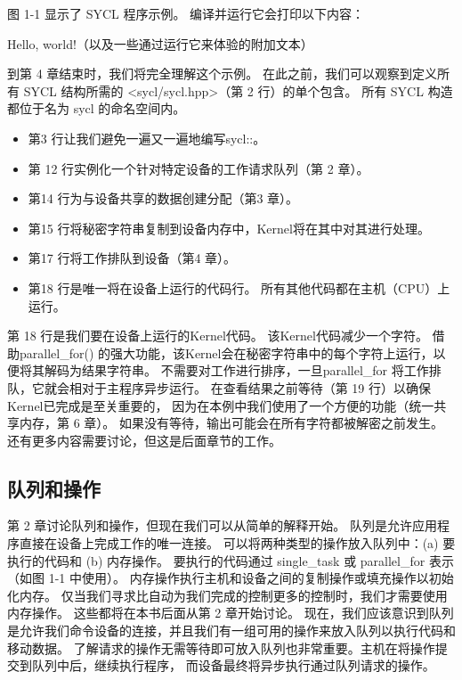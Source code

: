 图 1-1 显示了 SYCL 程序示例。 编译并运行它会打印以下内容：

Hello, world!（以及一些通过运行它来体验的附加文本）

到第 4 章结束时，我们将完全理解这个示例。
在此之前，我们可以观察到定义所有 SYCL 结构所需的 <sycl/sycl.hpp>（第 2 行）的单个包含。 
所有 SYCL 构造都位于名为 sycl 的命名空间内。

\begin{itemize}
	\item 第3 行让我们避免一遍又一遍地编写sycl::。

	\item 第 12 行实例化一个针对特定设备的工作请求队列（第 2 章）。

	\item 第14 行为与设备共享的数据创建分配（第3 章）。

	\item 第15 行将秘密字符串复制到设备内存中，Kernel将在其中对其进行处理。

	\item 第17 行将工作排队到设备（第4 章）。

	\item 第18 行是唯一将在设备上运行的代码行。 所有其他代码都在主机（CPU）上运行。
\end{itemize}

第 18 行是我们要在设备上运行的Kernel代码。 该Kernel代码减少一个字符。 
借助parallel\_for() 的强大功能，该Kernel会在秘密字符串中的每个字符上运行，以便将其解码为结果字符串。 
不需要对工作进行排序，一旦parallel\_for 将工作排队，它就会相对于主程序异步运行。 
在查看结果之前等待（第 19 行）以确保Kernel已完成是至关重要的，
因为在本例中我们使用了一个方便的功能（统一共享内存，第 6 章）。 
如果没有等待，输出可能会在所有字符都被解密之前发生。 还有更多内容需要讨论，但这是后面章节的工作。

\subsection{队列和操作}
第 2 章讨论队列和操作，但现在我们可以从简单的解释开始。 队列是允许应用程序直接在设备上完成工作的唯一连接。 
可以将两种类型的操作放入队列中：(a) 要执行的代码和 (b) 内存操作。 
要执行的代码通过 single\_task 或 parallel\_for 表示（如图 1-1 中使用）。 
内存操作执行主机和设备之间的复制操作或填充操作以初始化内存。 
仅当我们寻求比自动为我们完成的控制更多的控制时，我们才需要使用内存操作。 这些都将在本书后面从第 2 章开始讨论。
现在，我们应该意识到队列是允许我们命令设备的连接，并且我们有一组可用的操作来放入队列以执行代码和移动数据。
了解请求的操作无需等待即可放入队列也非常重要。主机在将操作提交到队列中后，继续执行程序，
而设备最终将异步执行通过队列请求的操作。


